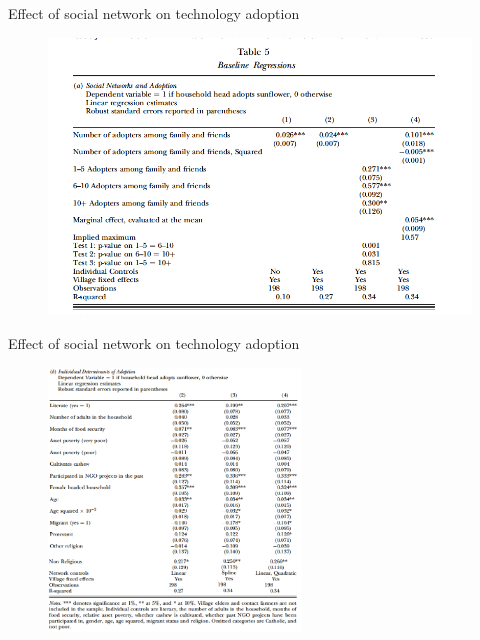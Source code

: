 \documentclass{beamer}
\begin{document}
\begin{frame}{Effect of social network on technology adoption}{}
\begin{figure}[h]
\begin{centering}
  \includegraphics[width=\textwidth]{01table5a}
   \label{fig:01table5a}
\end{centering}
\end{figure}
\end{frame}

\begin{frame}{Effect of social network on technology adoption}{}
\begin{figure}[h]
\begin{centering}
  \includegraphics[width=0.6\textwidth]{01table5b}
   \label{fig:01table5b}
\end{centering}
\end{figure}
\end{frame}
\end{document}
